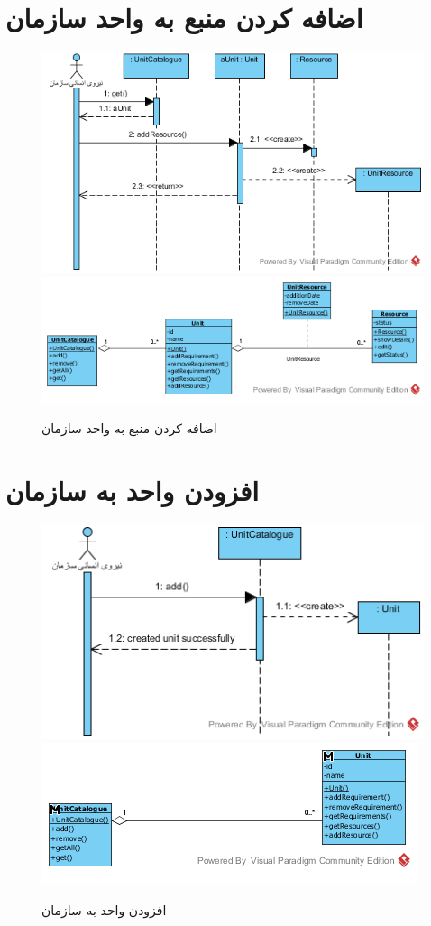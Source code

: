 \section{اضافه کردن منبع به واحد سازمان}
\begin{figure}[H]
	\centering
	\includegraphics[scale=0.8]{img/sequence-analysis/AddResourceToUnit}
	\includegraphics[scale=0.8]{img/sequence-analysis/AddResourceToUnitC}	
	\caption{اضافه کردن منبع به واحد سازمان}
\end{figure}

\section{افزودن واحد به سازمان}
\begin{figure}[H]
	\centering
	\includegraphics[scale=0.7]{img/sequence-analysis/AddUnitToOrganization}
	\includegraphics[scale=0.7]{img/sequence-analysis/AddUnitToOrganizationC}
	\caption{افزودن واحد به سازمان}
\end{figure}


